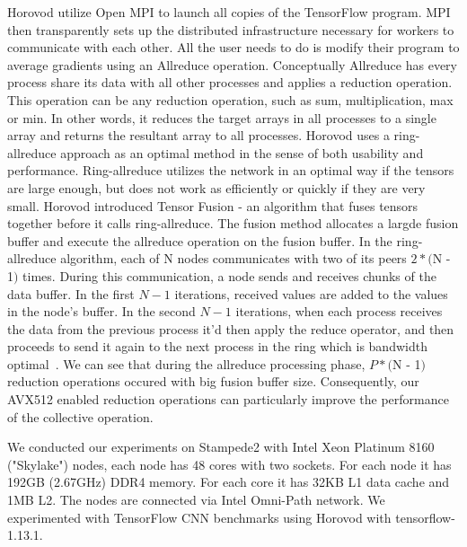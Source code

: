 \documentclass[sigconf]{acmart}
\begin{document}
Horovod utilize Open MPI to launch all copies of the TensorFlow program. MPI then transparently sets up the distributed infrastructure necessary for workers to communicate with each other. All the user needs to do is
modify their program to average gradients using an Allreduce operation. Conceptually Allreduce has every process share its data with all other processes and applies a reduction operation. This operation can be any reduction operation, such as sum, multiplication, max or min. In other words, it reduces the target arrays in all processes
to a single array and returns the resultant array to all processes. Horovod uses a ring-allreduce approach as an optimal method in the sense of both usability and performance.
Ring-allreduce utilizes the network in an optimal way if the tensors are large enough, but does not
work as efficiently or quickly if they are very small. Horovod introduced Tensor Fusion - an algorithm that fuses tensors together before it calls ring-allreduce. The fusion method allocates a largde fusion buffer and execute the allreduce operation on the fusion buffer.
In the ring-allreduce algorithm, each of N nodes communicates with two of its
peers $2 * ($N - 1$)$ times. During this communication, a node sends and receives chunks of the data
buffer. In the first $N - 1$ iterations, received values are added to the values in the node's buffer. In
the second $N - 1$ iterations, when each process receives the data from the previous process it'd then
apply the reduce operator, and then proceeds to send it again to the next process in the ring which is bandwidth optimal~\cite{allreduce-optimal}. We can see that during the allreduce processing phase, $P * ($N - 1$)$ reduction operations occured with big fusion buffer size. Consequently, our AVX512 enabled reduction operations can particularly improve the performance of the collective operation.

We conducted our experiments on Stampede2 with Intel Xeon Platinum 8160 ("Skylake") nodes, each node has 48 cores with two sockets. For each node it has 192GB (2.67GHz) DDR4 memory. For each core it has 32KB L1 data cache and 1MB L2. The nodes are connected via Intel Omni-Path network.
We experimented with TensorFlow CNN benchmarks using Horovod with tensorflow-1.13.1.
\end{document}
